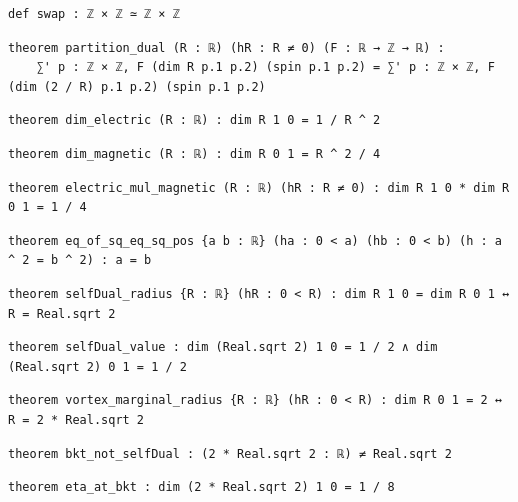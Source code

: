 \begin{lstlisting}[style=leancat]
def swap : ℤ × ℤ ≃ ℤ × ℤ
\end{lstlisting}

\begin{lstlisting}[style=leancat]
theorem partition_dual (R : ℝ) (hR : R ≠ 0) (F : ℝ → ℤ → ℝ) :
    ∑' p : ℤ × ℤ, F (dim R p.1 p.2) (spin p.1 p.2) = ∑' p : ℤ × ℤ, F (dim (2 / R) p.1 p.2) (spin p.1 p.2)
\end{lstlisting}

\begin{lstlisting}[style=leancat]
theorem dim_electric (R : ℝ) : dim R 1 0 = 1 / R ^ 2
\end{lstlisting}

\begin{lstlisting}[style=leancat]
theorem dim_magnetic (R : ℝ) : dim R 0 1 = R ^ 2 / 4
\end{lstlisting}

\begin{lstlisting}[style=leancat]
theorem electric_mul_magnetic (R : ℝ) (hR : R ≠ 0) : dim R 1 0 * dim R 0 1 = 1 / 4
\end{lstlisting}

\begin{lstlisting}[style=leancat]
theorem eq_of_sq_eq_sq_pos {a b : ℝ} (ha : 0 < a) (hb : 0 < b) (h : a ^ 2 = b ^ 2) : a = b
\end{lstlisting}

\begin{lstlisting}[style=leancat]
theorem selfDual_radius {R : ℝ} (hR : 0 < R) : dim R 1 0 = dim R 0 1 ↔ R = Real.sqrt 2
\end{lstlisting}

\begin{lstlisting}[style=leancat]
theorem selfDual_value : dim (Real.sqrt 2) 1 0 = 1 / 2 ∧ dim (Real.sqrt 2) 0 1 = 1 / 2
\end{lstlisting}

\begin{lstlisting}[style=leancat]
theorem vortex_marginal_radius {R : ℝ} (hR : 0 < R) : dim R 0 1 = 2 ↔ R = 2 * Real.sqrt 2
\end{lstlisting}

\begin{lstlisting}[style=leancat]
theorem bkt_not_selfDual : (2 * Real.sqrt 2 : ℝ) ≠ Real.sqrt 2
\end{lstlisting}

\begin{lstlisting}[style=leancat]
theorem eta_at_bkt : dim (2 * Real.sqrt 2) 1 0 = 1 / 8
\end{lstlisting}

